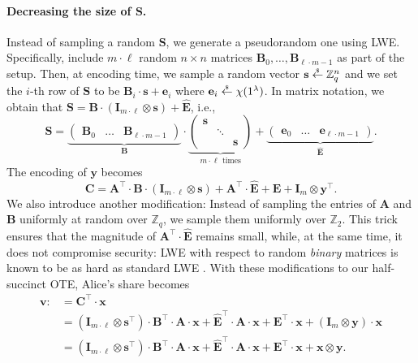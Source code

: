 \documentclass{article}
\newcommand{\getsr}{\overset{\raisebox{-1pt}{$\scriptscriptstyle \$$}}{\gets}}
\newcommand{\sample}{\getsr}
\newcommand{\Z}{\mathbb{Z}}
\renewcommand{\sec}{\ensuremath{\lambda}}
\newcommand{\id}{\ensuremath{\mathbf{I}}}
\newcommand\bbbone{1}
\begin{document}
\paragraph{Decreasing the size of $\mathbf{S}$.} Instead of sampling a random $\mathbf{S}$, we generate a pseudorandom one using LWE. Specifically, include $m\cdot \ell$ random $n\times n$ matrices $\mathbf{B}_0, \dots, \mathbf{B}_{\ell\cdot m-1}$ as part of the setup. Then, at encoding time, we sample a random vector $\mathbf{s}\sample\Z_q^n$ and we set the $i$-th row of $\mathbf{S}$ to be $\mathbf{B}_i\cdot \mathbf{s}+\mathbf{e}_i$ where $\mathbf{e}_i\sample\chi(\bbbone^\sec)$. In matrix notation, we obtain that $\mathbf{S}=\mathbf{B}\cdot (\id_{m\cdot \ell}\otimes \mathbf{s})+\hat{\mathbf{E}}$, i.e.,
\[\mathbf{S}=\underbrace{\begin{pmatrix}
\mathbf{B}_0 & \dots & \mathbf{B}_{\ell\cdot m-1}
    \end{pmatrix}}_{\mathbf{B}}\cdot \underbrace{\begin{pmatrix}
\mathbf{s} &  &\\
&\ddots &\\
&&\mathbf{s}
    \end{pmatrix}}_{m\cdot \ell \text{ times}}+\underbrace{\begin{pmatrix}
\mathbf{e}_0 & \dots & \mathbf{e}_{\ell\cdot m-1}
    \end{pmatrix}}_{\hat{\mathbf{E}}}.\]
The encoding of $\mathbf{y}$ becomes
\[\mathbf{C}=\mathbf{A}^\intercal\cdot \mathbf{B}\cdot (\id_{m\cdot \ell}\otimes \mathbf{s})+\mathbf{A}^\intercal \cdot \hat{\mathbf{E}}+\mathbf{E}+\id_m\otimes \mathbf{y}^\intercal.\]
We also introduce another modification: Instead of sampling the entries of $\mathbf{A}$ and $\mathbf{B}$ uniformly at random over $\Z_q$, we sample them uniformly over $\Z_2$. This trick ensures that the magnitude of $\mathbf{A}^\intercal \cdot \hat{\mathbf{E}}$ remains small, while, at the same time, it does not compromise security: LWE with respect to random \emph{binary} matrices is known to be as hard as standard LWE \cite{C:BLMR13}.
With these modifications to our half-succinct OTE, Alice's share becomes
\begin{align*}
\mathbf{v}:\!&=\mathbf{C}^\intercal\cdot \mathbf{x}\\
&=(\id_{m\cdot \ell}\otimes \mathbf{s}^\intercal)\cdot \mathbf{B}^\intercal\cdot \mathbf{A}\cdot \mathbf{x}+\hat{\mathbf{E}}^\intercal\cdot\mathbf{A}\cdot\mathbf{x}+\mathbf{E}^\intercal\cdot\mathbf{x}+(\id_m\otimes \mathbf{y})\cdot \mathbf{x}\\
&=(\id_{m\cdot \ell}\otimes \mathbf{s}^\intercal)\cdot \mathbf{B}^\intercal\cdot \mathbf{A}\cdot \mathbf{x}+\hat{\mathbf{E}}^\intercal\cdot\mathbf{A}\cdot\mathbf{x}+\mathbf{E}^\intercal\cdot\mathbf{x}+\mathbf{x}\otimes \mathbf{y}.
\end{align*}
\end{document}
